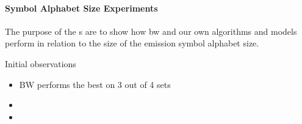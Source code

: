 \paragraph{Symbol Alphabet Size Experiments}
The purpose of the s are to show how \gls{bw} and our own algorithms and models perform in relation to the size of the emission symbol alphabet size.

	
	
Initial observations
\begin{itemize}
\item BW performs the best on 3 out of 4 sets
\item 
\item 
\end{itemize}	
	
